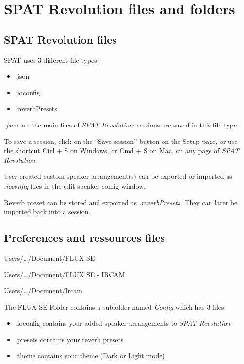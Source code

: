 \documentclass[
  letterpaper,
  DIV=11,
  numbers=noendperiod]{scrreport}
\providecommand{\tightlist}{%
  \setlength{\itemsep}{0pt}\setlength{\parskip}{0pt}}\usepackage{longtable,booktabs,array}
\begin{document}

\hypertarget{spat-revolution-files-and-folders}{%
\chapter{SPAT Revolution files and
folders}\label{spat-revolution-files-and-folders}}

\hypertarget{spat-revolution-files}{%
\section{SPAT Revolution files}\label{spat-revolution-files}}

SPAT uses 3 different file types:

\begin{itemize}
\tightlist
\item
  .json
\item
  .ioconfig
\item
  .reverbPresets
\end{itemize}

\emph{.json} are the main files of \emph{SPAT Revolution}: sessions are
saved in this file type.

To save a session, click on the ``Save session'' button on the Setup
page, or use the shortcut Ctrl + S on Windows, or Cmd + S on Mac, on any
page of \emph{SPAT Revolution}.

User created custom speaker arrangement(s) can be exported or imported
as \emph{.ioconfig} files in the edit speaker config window.

Reverb preset can be stored and exported as \emph{.reverbPresets.} They
can later be imported back into a session.

\hypertarget{preferences-and-ressources-files}{%
\section{Preferences and ressources
files}\label{preferences-and-ressources-files}}

Users/\ldots/Document/FLUX SE

Users/\ldots/Document/FLUX SE - IRCAM

Users/\ldots/Document/Ircam

The FLUX SE Folder contains a subfolder named \emph{Config} which has 3
files:

\begin{itemize}
\tightlist
\item
  .ioconfig contains your added speaker arrangements to \emph{SPAT
  Revolution}
\item
  .presets contains your reverb presets
\item
  .theme contains your theme (Dark or Light mode)
\end{itemize}
\end{document}

